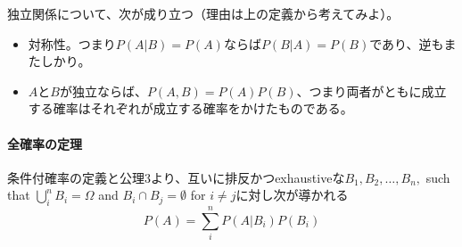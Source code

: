 \documentclass{jsarticle}
\begin{document}
独立関係について、次が成り立つ（理由は上の定義から考えてみよ）。
\begin{itemize}
	\item 対称性。つまり$P(A|B) = P(A)$ならば$P(B|A) = P(B)$であり、逆もまたしかり。
	\item $A$と$B$が独立ならば、$P(A,B) = P(A)P(B)$、つまり両者がともに成立する確率はそれぞれが成立する確率をかけたものである。
\end{itemize}

\paragraph{全確率の定理}
条件付確率の定義と公理3より、互いに排反かつexhaustiveな$B_1, B_2, \dots, B_n,$ such that $\bigcup_i^n B_i = \Omega$ and $B_i \cap B_j = \emptyset$ for $i \neq j$に対し次が導かれる 
$$P(A) = \sum_i^n P(A|B_i)P(B_i) $$




\end{document}
